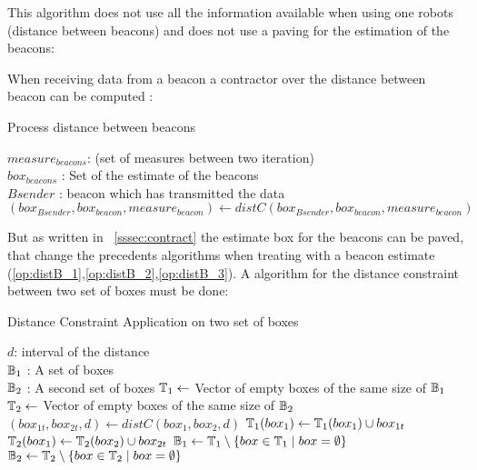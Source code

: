 This algorithm does not use all the information available when using one robots (distance between beacons) and does not use a paving for the estimation of the beacons:

When receiving data from a beacon a contractor over the distance between beacon can be computed :

\begin{algorithm}[H]
\caption{Process distance between beacons }
\label{alg:distBetBeaconsSlam}
\begin{algorithmic}[1]
\REQUIRE $measure_{beacons}$: (set of measures between two iteration)\\
   $box_{beacons}$ : Set of the estimate of the beacons\\
   $Bsender$ : beacon which has transmitted the data   
\label{op:distB_3}
\STATE $(box_{Bsender},box_{beacon},measure_{beacon}) \leftarrow distC(box_{Bsender},box_{beacon},measure_{beacon})$
\ENDFOR
\end{algorithmic}
\end{algorithm}

But as written in ~\ref{sssec:contract} the estimate box for the beacons can be paved, that change the precedents 
algorithms when treating with a beacon estimate (\ref{op:distB_1},\ref{op:distB_2},\ref{op:distB_3}). A algorithm for the distance constraint between two set of boxes must be done:

\begin{algorithm}[H]
\caption{Distance Constraint Application on two set of boxes }
\label{alg:distTwoSet}
\begin{algorithmic}[1]
\REQUIRE $d$: interval of the distance\\
   $\mathbb{B_{\textnormal{1}}}$ : A set of boxes\\
   $\mathbb{B_{\textnormal{2}}}$ : A second set of boxes
\STATE $\mathbb{T_{\textnormal{1}}} \leftarrow$ Vector of empty boxes of the same size of $\mathbb{B_{\textnormal{1}}}$
\STATE $\mathbb{T_{\textnormal{2}}} \leftarrow$ Vector of empty boxes of the same size of $\mathbb{B_{\textnormal{2}}}$
\STATE $(box_{1t},box_{2t},d) \leftarrow distC(box_1,box_2,d)$
\STATE $\mathbb{T_{\textnormal{1}}}(box_1) \leftarrow \mathbb{T_{\textnormal{1}}}(box_1)  \cup box_{1t}$
\STATE $\mathbb{T_{\textnormal{2}}}(box_1) \leftarrow \mathbb{T_{\textnormal{2}}}(box_2)  \cup box_{2t}$
\ENDFOR
\ENDFOR
\STATE $\mathbb{B_{\textnormal{1}}} \leftarrow \mathbb{T_{\textnormal{1}}}\setminus\{box \in \mathbb{T_{\textnormal{1}}} \mid box = \emptyset \}$
\STATE $\mathbb{B_{\textnormal{2}}} \leftarrow \mathbb{T_{\textnormal{2}}}\setminus\{box \in \mathbb{T_{\textnormal{2}}} \mid box = \emptyset \}$
\end{algorithmic}
\end{algorithm}

